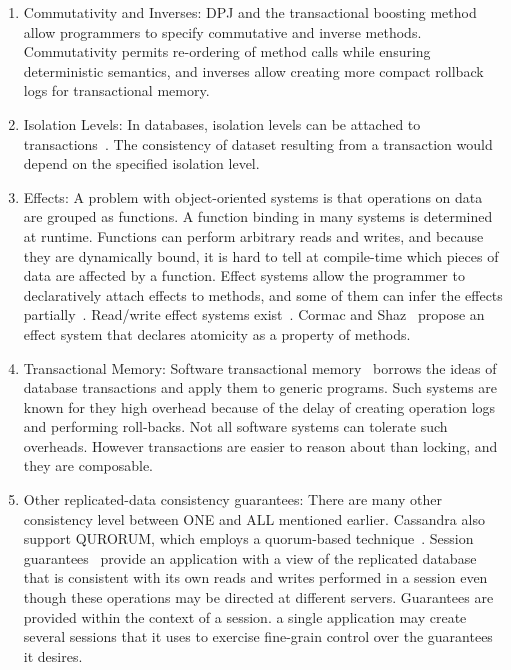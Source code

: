 \documentclass[]{usiinfprospectus}
\begin{document}
\begin{enumerate}
\item Commutativity and Inverses: DPJ and the transactional boosting method~\cite{herlihy2008transactional} allow programmers to specify commutative and inverse methods. Commutativity permits re-ordering of method calls while ensuring deterministic semantics, and inverses allow creating more compact rollback logs for transactional memory. 
	\item Isolation Levels: In databases, isolation levels can be attached to transactions~\cite{bernstein2009sql}. The consistency of dataset resulting from a transaction would depend on the specified isolation level.
	\item Effects: A problem with object-oriented systems is that operations on data are grouped as functions. A function binding in many systems is determined at runtime. Functions can perform arbitrary reads and writes, and because they are dynamically bound, it is hard to tell at compile-time which pieces of data are affected by a function. Effect systems allow the programmer to  declaratively attach effects to methods, and some of them can infer the effects partially~\cite{marino2009generic}. Read/write effect systems exist~\cite{Lucassen:1988:PES:73560.73564}. Cormac and Shaz~\cite{flanagan2003type} propose an effect system that declares atomicity as a property of methods.
	\item Transactional Memory: Software transactional memory~\cite{shavit1997software} borrows the ideas of database transactions and apply them to generic programs. Such systems are known for they high overhead because of the delay of creating operation logs and performing roll-backs. Not all software systems can tolerate such overheads. However transactions are easier to reason about than locking, and they are composable.
	\item Other replicated-data consistency guarantees: There are many other consistency level between ONE and ALL mentioned earlier. Cassandra also support QURORUM, which employs a quorum-based technique~\cite{gifford1979weighted}. Session guarantees~\cite{terry1994session} provide an application with a view of the replicated database that is consistent with its own reads and writes performed in a session even though these operations may be directed at different servers. Guarantees are provided within the context of a session. a single application may create several sessions that it uses to exercise fine-grain control over the guarantees it desires. 

\end{enumerate}
\end{document}
